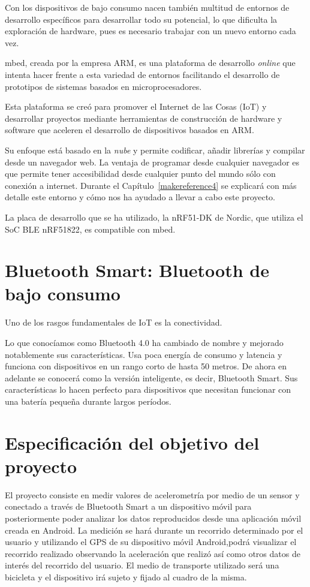 Con los dispositivos de bajo consumo nacen también multitud de entornos de desarrollo específicos para desarrollar todo su potencial, lo que dificulta la exploración de hardware, pues es necesario trabajar con un nuevo entorno cada vez. 

mbed, creada por la empresa ARM, es una plataforma de desarrollo \textit{online} que intenta hacer frente a esta variedad de entornos facilitando el desarrollo de prototipos de sistemas basados en microprocesadores.

Esta plataforma se creó para promover el Internet de las Cosas (IoT) y desarrollar proyectos mediante herramientas de construcción de hardware y software que aceleren el desarrollo de dispositivos basados en ARM.

Su enfoque está basado en la \textit{nube} y permite codificar, añadir librerías y compilar desde un navegador web. La ventaja de programar desde cualquier navegador es que permite tener accesibilidad desde cualquier punto del mundo sólo con conexión a internet. Durante el Capítulo~\ref{makereference4} se explicará con más detalle este entorno y cómo nos ha ayudado a llevar a cabo este proyecto.

La placa de desarrollo que se ha utilizado, la nRF51-DK de Nordic, que utiliza el SoC BLE nRF51822, es compatible con mbed.

\section{Bluetooth Smart: Bluetooth de bajo consumo}
\label{makereference1.2}

Uno de los rasgos fundamentales de IoT es la conectividad.

Lo que conocíamos como Bluetooth 4.0 ha cambiado de nombre y mejorado notablemente sus características. Usa poca energía de consumo y latencia y funciona con dispositivos en un rango corto de hasta 50 metros. De ahora en adelante se conocerá como la versión inteligente, es decir, Bluetooth Smart. 
Sus características lo hacen perfecto para dispositivos que necesitan funcionar con una batería pequeña durante largos períodos.

\section{Especificación del objetivo del proyecto}
\label{makereference1.3}

El proyecto consiste en medir valores de acelerometría por medio de un sensor y conectado a través de Bluetooth Smart a un dispositivo móvil para posteriormente poder analizar los datos reproducidos desde una aplicación móvil creada en Android.
La medición se hará durante un recorrido determinado por el usuario y utilizando el GPS de su dispositivo móvil Android,podrá visualizar el recorrido realizado observando la aceleración que realizó así como otros datos de interés del recorrido del usuario.
El medio de transporte utilizado será una bicicleta y el dispositivo irá sujeto y fijado al cuadro de la misma.

